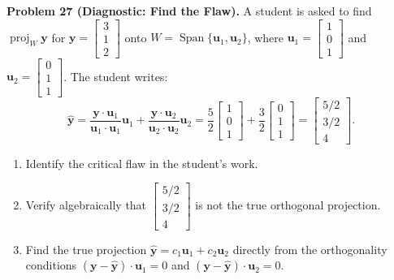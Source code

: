\documentclass[11pt, letterpaper]{article}
\theoremstyle{definition}
\theoremstyle{remark}
\begin{document}
\textbf{Problem 27 (Diagnostic: Find the Flaw).} A student is asked to find $\operatorname{proj}_W \mathbf{y}$ for $\mathbf{y} = \begin{bmatrix} 3 \\ 1 \\ 2 \end{bmatrix}$ onto $W = \operatorname{Span}\{\mathbf{u}_1, \mathbf{u}_2\}$, where $\mathbf{u}_1 = \begin{bmatrix} 1 \\ 0 \\ 1 \end{bmatrix}$ and $\mathbf{u}_2 = \begin{bmatrix} 0 \\ 1 \\ 1 \end{bmatrix}$. The student writes:
\[
\hat{\mathbf{y}} = \frac{\mathbf{y}\cdot\mathbf{u}_1}{\mathbf{u}_1\cdot\mathbf{u}_1}\mathbf{u}_1 + \frac{\mathbf{y}\cdot\mathbf{u}_2}{\mathbf{u}_2\cdot\mathbf{u}_2}\mathbf{u}_2 = \frac{5}{2}\begin{bmatrix} 1 \\ 0 \\ 1 \end{bmatrix} + \frac{3}{2}\begin{bmatrix} 0 \\ 1 \\ 1 \end{bmatrix} = \begin{bmatrix} 5/2 \\ 3/2 \\ 4 \end{bmatrix}.
\]
\begin{enumerate}[label=(\alph*)]
    \item Identify the critical flaw in the student's work.
    \item Verify algebraically that $\begin{bmatrix} 5/2 \\ 3/2 \\ 4 \end{bmatrix}$ is not the true orthogonal projection.
    \item Find the true projection $\hat{\mathbf{y}} = c_1 \mathbf{u}_1 + c_2 \mathbf{u}_2$ directly from the orthogonality conditions $(\mathbf{y} - \hat{\mathbf{y}}) \cdot \mathbf{u}_1 = 0$ and $(\mathbf{y} - \hat{\mathbf{y}}) \cdot \mathbf{u}_2 = 0$.
\end{enumerate}
\end{document}
